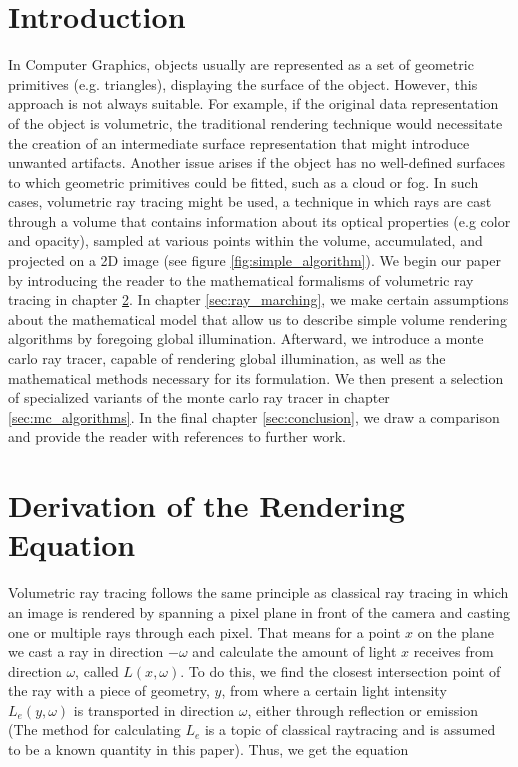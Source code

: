 




\section{Introduction}
In Computer Graphics, objects usually are represented as a set of geometric primitives \cite{KOBBELT2004801} (e.g. triangles), displaying the surface of the object. However, this approach is not always suitable. For example, if the original data representation of the object is volumetric, the traditional rendering technique would necessitate the creation of an intermediate surface representation that might introduce unwanted artifacts\cite{511}. Another issue arises if the object has no well-defined surfaces to which geometric primitives could be fitted, such as a cloud or fog\cite{10.1145/964965.808594}. In such cases, volumetric ray tracing might be used, a technique in which rays are cast through a volume that contains information about its optical properties (e.g color and opacity), sampled at various points within the volume, accumulated, and projected on a 2D image (see figure \ref{fig:simple_algorithm})\cite{511}.
We begin our paper by introducing the reader to the mathematical formalisms of volumetric ray tracing in chapter \ref{sec:math}. In chapter \ref{sec:ray_marching}, we make certain assumptions about the mathematical model that allow us to describe simple volume rendering algorithms by foregoing global illumination. Afterward, we introduce a monte carlo ray tracer, capable of rendering global illumination, as well as the mathematical methods necessary for its formulation. We then present a selection of specialized variants of the monte carlo ray tracer in chapter \ref{sec:mc_algorithms}. In the final chapter \ref{sec:conclusion}, we draw a comparison and provide the reader with references to further work. 




\section{Derivation of the Rendering Equation}
\label{sec:math}
Volumetric ray tracing follows the same principle as classical ray tracing in which an image is rendered by spanning a pixel plane in front of the camera and casting one or multiple rays through each pixel\cite{10.5555/94788}.
That means for a point ${x}$ on the plane we cast a ray in direction $-\omega$ and calculate the amount of light ${x}$ receives from direction $\omega$, called $L({x},\omega )$.
To do this, we find the closest intersection point of the ray with a piece of geometry,  ${y}$,  from where a certain light intensity $L_e({y},\omega )$ is transported in direction $\omega$, either through reflection or emission (The method for calculating $L_e$ is a topic of classical raytracing\cite{10.5555/94788} and is assumed to be a known quantity in this paper).
Thus, we get the equation 


